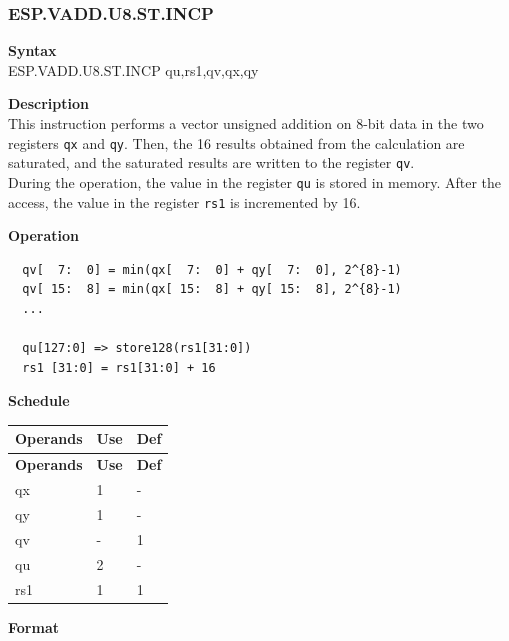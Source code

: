 \newpage
\subsubsection{ESP.VADD.U8.ST.INCP}\label{instruction:ESPVADDU8STINCP}
\textbf{Syntax}\\
ESP.VADD.U8.ST.INCP qu,rs1,qv,qx,qy

\textbf{Description}\\
This instruction performs a vector unsigned addition on 8-bit data in the two registers \lstinline{qx} and \lstinline{qy}. Then, the 16 results obtained from the calculation are saturated, and the saturated results are written to the register \lstinline{qv}. \\ During the operation, the value in the register \lstinline{qu} is stored in memory. After the access, the value in the register \lstinline{rs1} is incremented by 16.

\textbf{Operation}\\
\begin{lstlisting}
  qv[  7:  0] = min(qx[  7:  0] + qy[  7:  0], 2^{8}-1)
  qv[ 15:  8] = min(qx[ 15:  8] + qy[ 15:  8], 2^{8}-1)
  ...

  qu[127:0] => store128(rs1[31:0])
  rs1 [31:0] = rs1[31:0] + 16
\end{lstlisting}

\textbf{Schedule}\\
\begin{longtable}[c]{|l|l|l|}
    \hline
    \rowcolor{lightgray}
    \textbf{Operands} & \textbf{Use} & \textbf{Def} \\\hline
    \endfirsthead
    \hline
    \rowcolor{lightgray}
     \textbf{Operands} & \textbf{Use} & \textbf{Def} \\\hline
    \endhead
    \hline
    \endfoot

    qx & 1 & - \\\hline
  qy & 1 & - \\\hline
     qv & - & 1 \\\hline
     qu & 2 & - \\\hline
     rs1 & 1 & 1

\end{longtable}

\textbf{Format}\\

